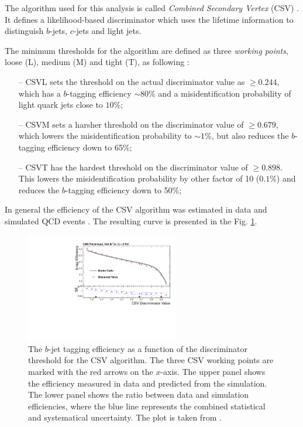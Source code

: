 The algorithm used for this analysis is called \textit{Combined Secondary Vertex} (CSV) \cite{CMS-PAS-BTV-13-001}. It defines a likelihood-based discriminator which uses 
the lifetime information to distinguish $b$-jets, $c$-jets and light jets.

The minimum thresholds for the algorithm are defined as three \textit{working points}, loose (L), medium (M) and tight (T), as following \cite{CMS-PAS-BTV-13-001}:

\begin{itemize}
 \item [--] CSVL sets the threshold on the actual discriminator value as $\geq 0.244$, which has a $b$-tagging efficiency $\sim 80\%$ and a misidentification probability of
 light quark jets close to $10\%$;
 \item [--] CSVM sets a harsher threshold on the discriminator value of $\geq 0.679$, which lowers the misidentification probability to $\sim 1\%$, but also
 reduces the $b$-tagging efficiency down to 65$\%$;
 \item [--] CSVT has the hardest threshold on the discriminator value of $\geq 0.898$. This lowers the misidentification probability by other factor of 10 ($0.1\%$)
 and reduces the $b$-tagging efficiency down to 50$\%$;
\end{itemize}

In general the efficiency of the CSV algorithm was estimated in data and simulated QCD events \cite{CMS-PAS-BTV-13-001}. The resulting curve is presented in the Fig. \ref{fig:CSVeff}.

\begin{figure}[t]
  \centering
  \includegraphics[width=0.6\textwidth]{04_event_reconstruction/plots/Figure_012-b.pdf}
  \caption{The $b$-jet tagging efficiency as a function of the discriminator threshold for the CSV algorithm. The three CSV working points are marked with the red arrows on the $x$-axis.
  The upper panel shows the efficiency measured in data and predicted from the simulation.
  The lower panel shows the ratio between data and simulation efficiencies, where the blue line represents the combined statistical and systematical uncertainty. The plot is taken from \cite{CMS-PAS-BTV-13-001}.}
  \label{fig:CSVeff}
\end{figure}

